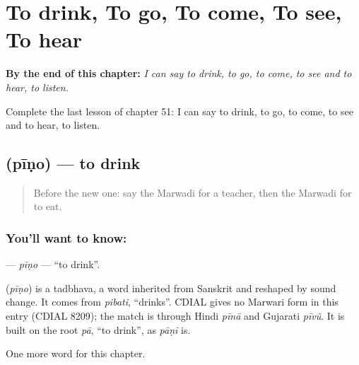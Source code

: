 
\chapter{To drink, To go, To come, To see, To hear}
\label{ch:mw-to-drink-to-go-to-come-to-see-to-hear}

\begin{chapteropening}
\textbf{By the end of this chapter:} \emph{I can say to drink, to go, to come, to see and to hear, to listen.}

Complete the last lesson of chapter 51: I can say to drink, to go, to come, to see and to hear, to listen.
\end{chapteropening}

\section[\texorpdfstring{\mw{पीणो} (pīṇo)}{पीणो (pīṇo)}]{ (pīṇo) — to drink}

\label{lesson:MW-C51-pino}



\begin{quote}
Before the new one: say the Marwadi for a teacher, then the Marwadi for to eat.
\end{quote}

\subsection*{You'll want to know: }
\textbf{} — \emph{pīṇo} — \textquotedblleft{}to drink\textquotedblright{}.

\begin{cousinweb}
\textbf{} (\emph{pīṇo}) is a tadbhava, a word inherited from Sanskrit and reshaped by sound change. It comes from \emph{pibati}, \textquotedblleft{}drinks\textquotedblright{}. CDIAL gives no Marwari form in this entry (CDIAL 8209); the match is through Hindi \emph{pīnā} and Gujarati \emph{pīvũ}. It is built on the root \emph{pā}, \textquotedblleft{}to drink\textquotedblright{}, as \emph{pāṇī} is.
\end{cousinweb}

\begin{grammarlens}[title={What you've built}]
One more word for this chapter.
\end{grammarlens}

